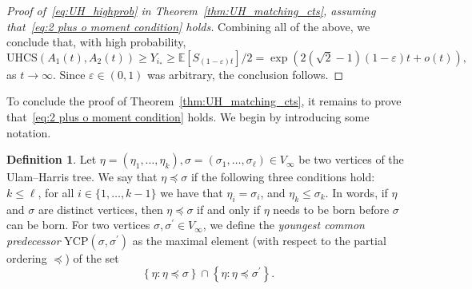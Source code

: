 \documentclass[11pt]{article}
\numberwithin{equation}{section}
\newcommand{\E}{\mathbb{E}} %
\newcommand{\eps}{\varepsilon} %
\newcommand{\UHCS}{\mathrm{UHCS}} %
\newcommand{\ycp}{\mathrm{YCP}} %
\theoremstyle{definition}
\newtheorem{definition}[theorem]{Definition}
\begin{document}
\begin{proof}[Proof of~\eqref{eq:UH_highprob} in Theorem~\ref{thm:UH_matching_cts}, assuming that~\eqref{eq:2 plus o moment condition} holds]
Combining all of the above, we conclude that, with high probability,  
\[
\UHCS(A_{1}(t), A_{2}(t)) 
\geq Y_{i_{*}} 
\geq \E \left[ S_{(1-\eps)t} \right] / 2
= \exp \left( 2 \left( \sqrt{2} - 1 \right) (1-\eps) t + o(t) \right),
\]
as $t\to \infty$. Since $\eps \in (0,1)$ was arbitrary,  the conclusion follows. 
\end{proof}

To conclude the proof of Theorem~\ref{thm:UH_matching_cts}, it remains to prove that~\eqref{eq:2 plus o moment condition} holds. We begin by introducing some notation. 

\begin{definition}\label{def:ycp}
Let $\eta = (\eta_{1}, \ldots, \eta_{k}), \sigma = (\sigma_{1}, \ldots, \sigma_{\ell}) \in V_{\infty}$ be two vertices of the Ulam--Harris tree. 
We say that $\eta \preccurlyeq \sigma$ if the following three conditions hold: 
$k \leq \ell$, 
for all $i \in \{1, \ldots, k-1\}$ we have that $\eta_{i} = \sigma_{i}$, 
and $\eta_{k} \leq \sigma_{k}$. 
In words, if $\eta$ and $\sigma$ are distinct vertices, then $\eta \preccurlyeq \sigma$ if and only if $\eta$ needs to be born before $\sigma$ can be born. 
For two vertices $\sigma, \sigma^\prime \in V_{\infty}$, we define the \emph{youngest common predecessor} $\ycp(\sigma, \sigma^\prime)$ as the maximal element (with respect to the partial ordering $\preccurlyeq$) of the set
\begin{equation*}
    \left\{ \eta : \eta \preccurlyeq \sigma \right\} \cap 
    \left\{ \eta : \eta \preccurlyeq \sigma^\prime \right\}.
\end{equation*}
\end{definition}
\end{document}
